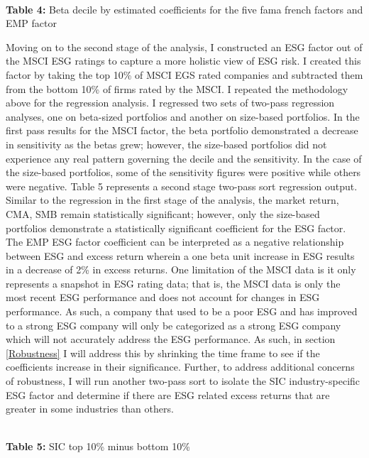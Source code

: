\begin{center}
    \paperspacingnarrow
    \\
    \textbf{Table 4:} Beta decile by estimated coefficients for the  five fama french factors and EMP factor\\
    \paperspacingwide
\end{center}

Moving on to the second stage of the analysis, I constructed an ESG factor out of the MSCI ESG ratings to capture a more holistic view of ESG risk. I created this factor by taking the top 10\% of MSCI EGS rated companies and subtracted them from the bottom 10\% of firms rated by the MSCI. I repeated the methodology above for the regression analysis. I  regressed two sets of two-pass regression analyses, one on beta-sized portfolios and another on size-based portfolios. In the first pass results for the MSCI factor, the beta portfolio demonstrated a decrease in sensitivity as the betas grew; however, the size-based portfolios did not experience any real pattern governing the decile and the sensitivity. In the case of the size-based portfolios, some of the sensitivity figures were positive while others were negative. Table 5 represents a second stage two-pass sort regression output. Similar to the regression in the first stage of the analysis, the market return, CMA, SMB remain statistically significant; however, only the size-based portfolios demonstrate a statistically significant coefficient for the ESG factor.  The EMP ESG factor coefficient can be interpreted as a negative relationship between ESG and excess return wherein a one beta unit increase in ESG results in a decrease of 2\% in excess returns. One limitation of the MSCI data is it only represents a snapshot in ESG rating data; that is, the MSCI data is only the most recent ESG performance and does not account for changes in ESG performance. As such, a company that used to be a  poor ESG and has improved to a strong ESG company will only be categorized as a strong ESG company which will not accurately address the ESG performance.  As such, in section \ref{Robustness} I will address this by shrinking the time frame to see if the coefficients increase in their significance. Further,  to address additional concerns of robustness, I will run another two-pass sort to isolate the SIC industry-specific ESG factor and determine if there are ESG related excess returns that are greater in some industries than others. 

\begin{center}
    \paperspacingnarrow
    \\
    \textbf{Table 5:} SIC top 10\% minus bottom 10\%
    \paperspacingwide
\end{center}